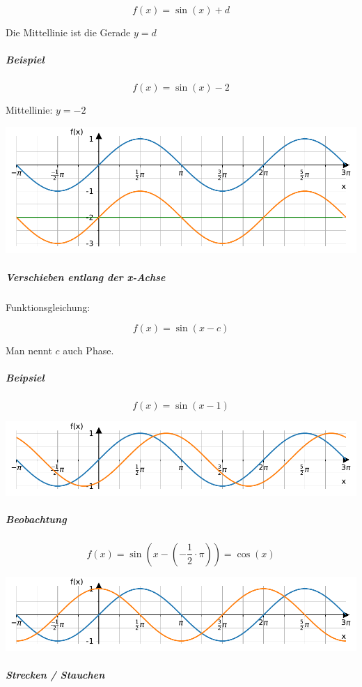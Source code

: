 \documentclass[
  11pt,
  a4paper,
  DIV=11,
  numbers=noendperiod]{scrartcl}
\let\oldsubparagraph\subparagraph
\renewcommand{\subparagraph}[1]{\oldsubparagraph{#1}\mbox{}}
\begin{document}
\[
f(x)=\sin(x)+d
\]

Die Mittellinie ist die Gerade \(y=d\)

\subparagraph{Beispiel}\label{beispiel}

\[
f(x)= \sin(x)-2
\]

Mittellinie: \(y=-2\)

\includegraphics{7_Trigonometrische_Funktionen_files/figure-pdf/cell-10-output-1.pdf}

\subparagraph{Verschieben entlang der
x-Achse}\label{verschieben-entlang-der-x-achse}

Funktionsgleichung:

\[
f(x)=\sin(x-c)
\]

Man nennt \(c\) auch Phase.

\subparagraph{Beipsiel}\label{beipsiel}

\[
f(x)= \sin(x-1)
\]

\includegraphics{7_Trigonometrische_Funktionen_files/figure-pdf/cell-11-output-1.pdf}

\subparagraph{Beobachtung}\label{beobachtung}

\[
f(x)=\sin(x-\left(-\frac{1}{2}\cdot \pi\right))=\cos(x)
\]

\includegraphics{7_Trigonometrische_Funktionen_files/figure-pdf/cell-12-output-1.pdf}

\subparagraph{Strecken / Stauchen}\label{strecken-stauchen}
\end{document}
